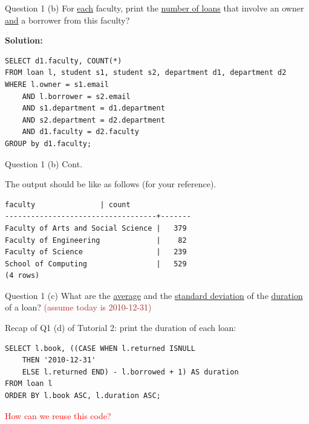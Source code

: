 \begin{frame}[fragile]{Question 1 (b)}
For \underline{each} faculty, print the \underline{number of loans} that involve an owner \underline{and} a borrower from this faculty?
\vspace{10pt}

\textbf{Solution:}\\
\begin{lstlisting}
SELECT d1.faculty, COUNT(*)
FROM loan l, student s1, student s2, department d1, department d2
WHERE l.owner = s1.email 
	AND l.borrower = s2.email
	AND s1.department = d1.department
	AND s2.department = d2.department
	AND d1.faculty = d2.faculty
GROUP by d1.faculty;
\end{lstlisting} \vspace{10pt}
\end{frame}

\begin{frame}[fragile]{Question 1 (b) Cont.}

The output should be like as follows (for your reference).\\ \vspace{10pt}
\begin{lstlisting}[style=terminial]
             faculty               | count
-----------------------------------+-------
Faculty of Arts and Social Science |   379
Faculty of Engineering             |    82
Faculty of Science                 |   239
School of Computing                |   529
(4 rows)	
\end{lstlisting}
\end{frame}


\begin{frame}[fragile]{Question 1 (c)}
What are the \underline{average} and the \underline{standard deviation} of the \underline{duration} of a loan? \textcolor{brown}{(assume today is 2010-12-31)}\\ \vspace{10pt}

Recap of Q1 (d) of Tutorial 2: print the duration of each loan:
\begin{lstlisting}
SELECT l.book, ((CASE WHEN l.returned ISNULL 
	THEN '2010-12-31'
	ELSE l.returned END) - l.borrowed + 1) AS duration 
FROM loan l
ORDER BY l.book ASC, l.duration ASC;
\end{lstlisting}

\textcolor{red}{How can we reuse this code?}
\end{frame}


